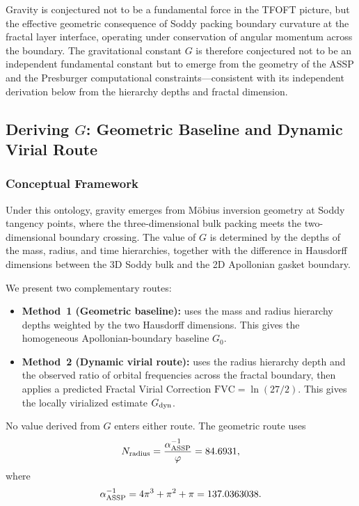 \documentclass[11pt,a4paper]{article}
\begin{document}
      Gravity is conjectured not to be a fundamental force in the TFOFT picture, but the effective geometric consequence of Soddy packing boundary curvature at the fractal layer interface, operating under conservation of angular momentum across the boundary. The gravitational constant $G$ is therefore conjectured not to be an independent fundamental constant but to emerge from the geometry of the ASSP and the Presburger computational constraints---consistent with its independent derivation below from the hierarchy depths and fractal dimension.


  \subsection{Deriving \(G\): Geometric Baseline and Dynamic Virial Route}
  \label{sec:G_deriv}

    \subsubsection{Conceptual Framework}

      Under this ontology, gravity emerges from Möbius inversion geometry at Soddy tangency points, where the three-dimensional bulk packing meets the two-dimensional boundary crossing. The value of \(G\) is determined by the depths of the mass, radius, and time hierarchies, together with the difference in Hausdorff dimensions between the 3D Soddy bulk and the 2D Apollonian gasket boundary.

      We present two complementary routes:

      \begin{itemize}
        \item \textbf{Method~1 (Geometric baseline):} uses the mass and radius hierarchy depths weighted by the two Hausdorff dimensions. This gives the homogeneous Apollonian-boundary baseline \(G_0\).

        \item \textbf{Method~2 (Dynamic virial route):} uses the radius hierarchy depth and the observed ratio of orbital frequencies across the fractal boundary, then applies a predicted Fractal Virial Correction \(\mathrm{FVC}=\ln(27/2)\). This gives the locally virialized estimate \(G_{\rm dyn}\).
      \end{itemize}

      No value derived from \(G\) enters either route. The geometric route uses
      \[
      N_{\rm radius}
      =
      \frac{\alpha^{-1}_{\rm ASSP}}{\varphi}
      =
      84.6931,
      \]
      where
      \[
      \alpha^{-1}_{\rm ASSP}
      =
      4\pi^3+\pi^2+\pi
      =
      137.0363038.
      \]
\end{document}
